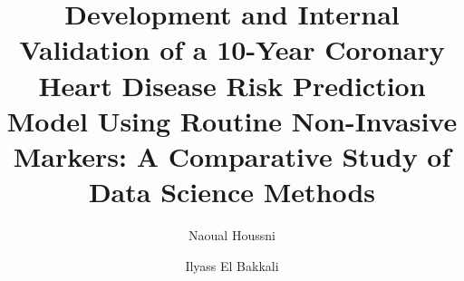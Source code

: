 \documentclass[manuscript, screen, review]{jair}
\begin{document}
\title[10-Year CHD Risk Prediction]{Development and Internal Validation of a 10-Year Coronary Heart Disease Risk Prediction Model Using Routine Non-Invasive Markers: A Comparative Study of Data Science Methods}

\author{Naoual Houssni}

\author{Ilyass El Bakkali}

\renewcommand{\shortauthors}{Houssni \& El Bakkali}
\end{document}
